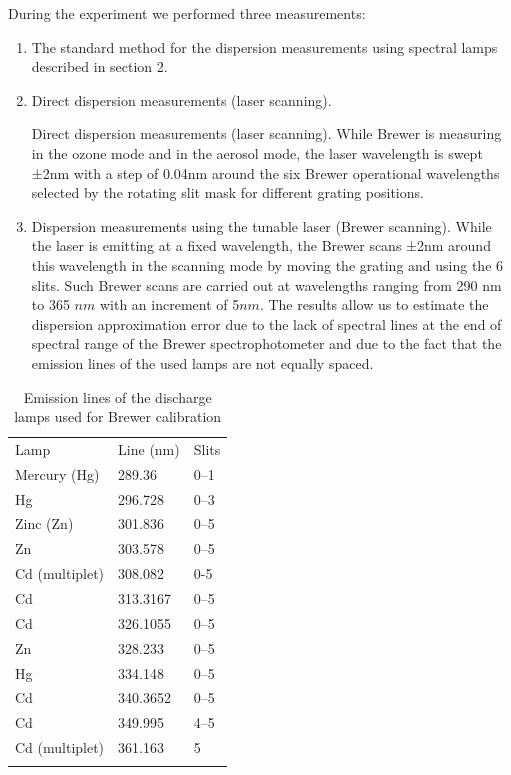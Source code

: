 \documentclass[acp, manuscript]{copernicus}
\begin{document}
During the experiment we performed three measurements: 
\begin{enumerate}


\item The standard method for the dispersion measurements using spectral lamps described in section 2.

\item  Direct dispersion measurements (laser scanning). 

Direct dispersion measurements (laser scanning). While Brewer is measuring in the ozone mode and in the aerosol mode, the laser wavelength is swept ±2\unit{nm} with a step of 0.04\unit{nm} around the six Brewer operational wavelengths selected by the rotating slit mask for different grating positions.



\item  Dispersion measurements using the tunable laser (Brewer scanning). While the laser is emitting at a fixed wavelength, the Brewer scans ±2\unit{nm} around this wavelength in the scanning mode by moving the grating and using the 6 slits. Such Brewer scans are carried out at wavelengths ranging from 290 \unit{nm} to 365 $\unit{nm}$ with an increment of 5$\unit{nm}$. The results allow us to estimate the dispersion approximation error due to the lack of spectral lines at the end of spectral range of the Brewer spectrophotometer and due to the fact that the emission lines of the used lamps are not equally spaced.

\end{enumerate}



\begin{table}[t]
\caption{Emission lines of the discharge lamps used for Brewer calibration}
\begin{tabular}{lll}
\tophline
Lamp           & Line (nm) & Slits \\
\middlehline
Mercury (Hg)   & 289.36    & 0–1   \\
Hg             & 296.728   & 0–3   \\
Zinc (Zn)      & 301.836   & 0–5   \\
Zn             & 303.578   & 0–5   \\
Cd (multiplet) & 308.082   & 0-5   \\
Cd             & 313.3167  & 0–5   \\
Cd             & 326.1055  & 0–5   \\
Zn             & 328.233   & 0–5   \\
Hg             & 334.148   & 0–5   \\
Cd             & 340.3652  & 0–5   \\
Cd             & 349.995   & 4–5   \\
Cd (multiplet) & 361.163   & 5     \\
\bottomhline
\end{tabular}
\belowtable{} %
\label{tab:dsp_lines}
\end{table}
\end{document}
